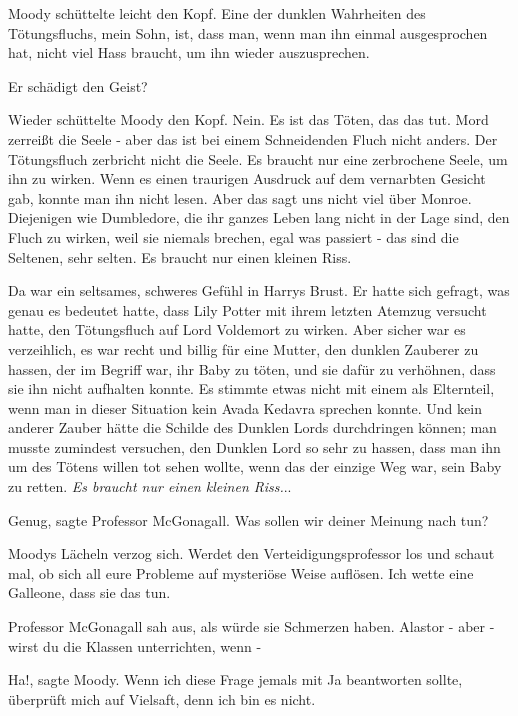 Moody schüttelte leicht den Kopf. \glqq{}Eine der dunklen Wahrheiten des
Tötungsfluchs, mein Sohn, ist, dass man, wenn man ihn einmal ausgesprochen hat,
nicht viel Hass braucht, um ihn wieder auszusprechen.\grqq{}

\glqq{}Er schädigt den Geist?\grqq{}

Wieder schüttelte Moody den Kopf. \glqq{}Nein. Es ist das Töten, das das tut.
Mord zerreißt die Seele - aber das ist bei einem Schneidenden Fluch nicht
anders. Der Tötungsfluch zerbricht nicht die Seele. Es braucht nur eine
zerbrochene Seele, um ihn zu wirken.\grqq{} Wenn es einen traurigen Ausdruck auf
dem vernarbten Gesicht gab, konnte man ihn nicht lesen. \glqq{}Aber das sagt uns
nicht viel über Monroe. Diejenigen wie Dumbledore, die ihr ganzes Leben lang
nicht in der Lage sind, den Fluch zu wirken, weil sie niemals brechen, egal was
passiert - das sind die Seltenen, sehr selten. Es braucht nur einen kleinen
Riss.\grqq{}

Da war ein seltsames, schweres Gefühl in Harrys Brust. Er hatte sich gefragt,
was genau es bedeutet hatte, dass Lily Potter mit ihrem letzten Atemzug versucht
hatte, den Tötungsfluch auf Lord Voldemort zu wirken. Aber sicher war es
verzeihlich, es war recht und billig für eine Mutter, den dunklen Zauberer zu
hassen, der im Begriff war, ihr Baby zu töten, und sie dafür zu verhöhnen, dass
sie ihn nicht aufhalten konnte. Es stimmte etwas nicht mit einem als Elternteil,
wenn man in dieser Situation kein Avada Kedavra sprechen konnte. Und kein
anderer Zauber hätte die Schilde des Dunklen Lords durchdringen können; man
musste zumindest versuchen, den Dunklen Lord so sehr zu hassen, dass man ihn um
des Tötens willen tot sehen wollte, wenn das der einzige Weg war, sein Baby zu
retten. \emph{Es braucht nur einen kleinen Riss.}..

\glqq{}Genug\grqq{}, sagte Professor McGonagall. \glqq{}Was sollen wir deiner
Meinung nach tun?\grqq{}

Moodys Lächeln verzog sich. \glqq{}Werdet den Verteidigungsprofessor los und
schaut mal, ob sich all eure Probleme auf mysteriöse Weise auflösen. Ich wette
eine Galleone, dass sie das tun.\grqq{}

Professor McGonagall sah aus, als würde sie Schmerzen haben. \glqq{}Alastor -
aber - wirst du die Klassen unterrichten, wenn -\grqq{}

\glqq{}Ha!\grqq{}, sagte Moody. \glqq{}Wenn ich diese Frage jemals mit Ja
beantworten sollte, überprüft mich auf Vielsaft, denn ich bin es nicht.\grqq{}

